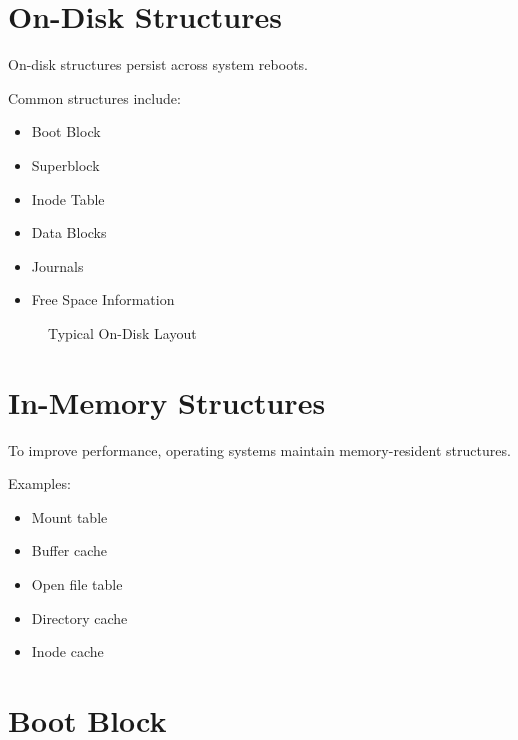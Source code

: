 \section{On-Disk Structures}

On-disk structures persist across system reboots.

Common structures include:

\begin{itemize}
\item Boot Block
\item Superblock
\item Inode Table
\item Data Blocks
\item Journals
\item Free Space Information
\end{itemize}

\begin{figure}[H]
\centering
{}
\caption{Typical On-Disk Layout}
\end{figure}

\section{In-Memory Structures}

To improve performance, operating systems maintain memory-resident structures.

Examples:

\begin{itemize}
\item Mount table
\item Buffer cache
\item Open file table
\item Directory cache
\item Inode cache
\end{itemize}

\section{Boot Block}

